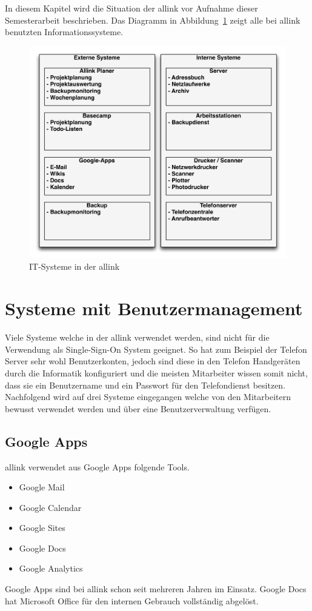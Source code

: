 In diesem Kapitel wird die Situation der allink vor Aufnahme dieser Semesterarbeit beschrieben. Das Diagramm in Abbildung~\ref{fig:systemlandschaft} zeigt alle bei allink benutzten Informationssysteme.
\begin{figure}[h]
  \centering
	\includegraphics[width=1\textwidth]{include/systemlandschaft.pdf}
	\caption{IT-Systeme in der allink}
	\label{fig:systemlandschaft}
\end{figure}


\section{Systeme mit Benutzermanagement}
\label{sec:Systeme mit Benutzermanagement}
Viele Systeme welche in der allink verwendet werden, sind nicht für die Verwendung als Single-Sign-On System geeignet. So hat zum Beispiel der Telefon Server sehr wohl Benutzerkonten, jedoch sind diese in den Telefon Handgeräten durch die Informatik konfiguriert und die meisten Mitarbeiter wissen somit nicht, dass sie ein Benutzername und ein Passwort für den Telefondienst besitzen. Nachfolgend wird auf drei Systeme eingegangen welche von den Mitarbeitern bewusst verwendet werden und über eine Benutzerverwaltung verfügen.

\subsection{Google Apps}
\label{subs:Google_Apps}
allink verwendet aus Google Apps folgende Tools. 
\begin{itemize}
	\item Google Mail 
	\item Google Calendar 
	\item Google Sites 
	\item Google Docs 
	\item Google Analytics 
\end{itemize}
Google Apps sind bei allink schon seit mehreren Jahren im Einsatz. Google Docs hat Microsoft Office für den internen Gebrauch vollständig abgelöst.

